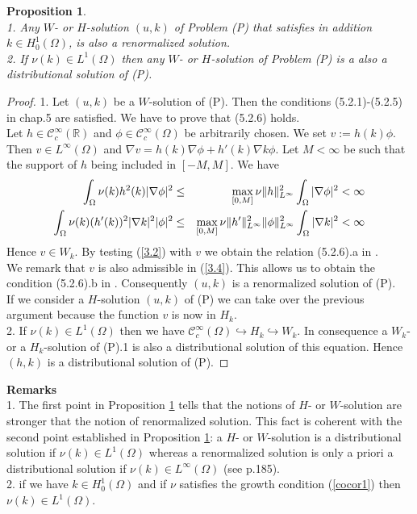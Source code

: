 \documentclass{elsart}
\newtheorem{pro}[defi]{Proposition}
\begin{document}
\begin{pro}\label{pro1} \noindent \\ 
1. Any $W$- or $H$-solution $(u,k)$ of Problem (P) that satisfies in addition  
   $k\in H^1_0(\Omega)$, is also a renormalized solution. \\ 
2. If $\nu(k) \in L^1(\Omega)$ then any $W$- or $H$-solution of
   Problem (P) is a also a distributional solution of (P).
\end{pro}
\begin{proof}
1. Let $(u,k)$ be a $W$-solution of (P). Then the conditions
   (5.2.1)-(5.2.5) in \cite{lewan} chap.5 are satisfied. We have to
prove that (5.2.6) holds. \\ 
Let $h \in \mathcal{C}_{c}^{\infty}(\mathbb R)$ and 
$\phi \in \mathcal{C}_{c}^{\infty}(\Omega)$ be arbitrarily chosen. We
set $v:=h(k)\phi$. Then  $v\in L^{\infty}(\Omega)$ and 
$\nabla v = h(k)\nabla \phi + h'(k)\nabla k \phi$. Let $M < \infty$ be 
such that the support of $h$ being included in $[-M,M]$. We have 
\begin{eqnarray}
\int_{\Omega} \nu(k) h^2(k) |\nabla \phi|^2 &\leq& 
\max\limits_{[0,M]}\nu \|h\|_{L^{\infty}}^2 \int_{\Omega}|\nabla \phi|^2
< \infty \notag \\ 
\int_{\Omega} \nu(k) (h'(k))^2 |\nabla k|^2 |\phi|^2 &\leq& 
\max\limits_{[0,M]}\nu \|h'\|_{L^{\infty}}^2 \|\phi\|_{L^{\infty}}^2\int_{\Omega}|\nabla k|^2
< \infty \notag  
\end{eqnarray}
Hence $v\in W_k$. By testing (\ref{3.2}) with $v$ we obtain the
relation (5.2.6).a in \cite{lewan}. \\ 
We remark that $v$ is also admissible in (\ref{3.4}). This allows us to
obtain the condition (5.2.6).b in \cite{lewan}. Consequently 
$(u,k)$ is a renormalized solution of (P). \\ 
If we consider a $H$-solution $(u,k)$ of (P) we can take over the
previous argument because the function $v$ is now in $H_k$. \\ 
2. If $\nu(k)\in L^1(\Omega)$ then we have 
$\mathcal{C}_{c}^{\infty}(\Omega) \hookrightarrow H_k \hookrightarrow
  W_k$. In consequence a $W_k$- or a $H_k$-solution of (P).1 is also a
  distributional solution of this equation. Hence $(h,k)$ is a
  distributional solution of (P).
\end{proof}

{\bf Remarks} \noindent \\ 
1. The first point in Proposition \ref{pro1} tells that the notions of 
$H$- or $W$-solution are stronger that the notion of renormalized
solution. This fact is coherent with the second point established in Proposition
\ref{pro1}: a $H$- or $W$-solution is a distributional solution if 
$\nu(k)\in L^1(\Omega)$ whereas a renormalized solution is only a priori
a distributional solution if $\nu(k)\in L^{\infty}(\Omega)$ (see
\cite{lewan} p.185). \\ 
2. if we have $k\in H^1_0(\Omega)$ and if $\nu$ satisfies the growth
condition (\ref{cocor1}) then $\nu(k)\in L^1(\Omega)$.
\end{document}
